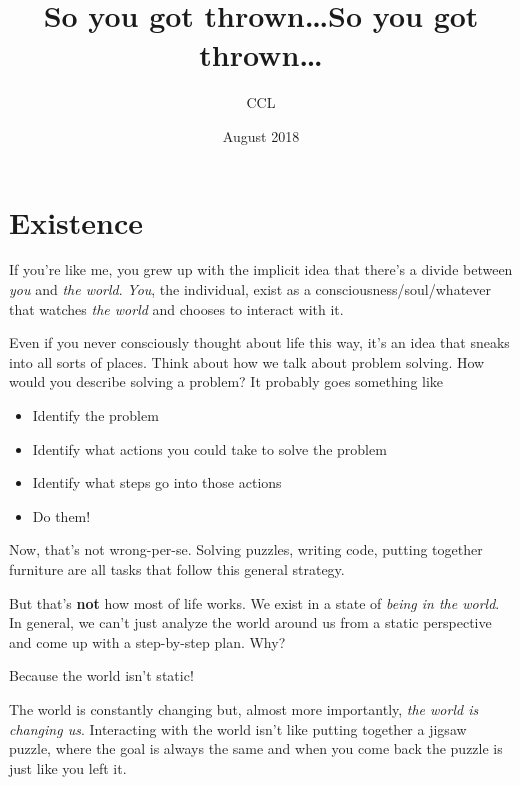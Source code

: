 \documentclass[statementpaper,oneside,article,14pt]{memoir}
\title{So you got thrown\ldots}
\author{CCL}
\date{August 2018}
\newcommand{\BackgroundPic}[1]{%
\put(0,0){%
\parbox[b][\paperheight]{\paperwidth}{%
\vfill
\centering
{\transparent{0.4} \texttt{[image: \#1]}}%
\vfill
}}}
\begin{document}
\title{So you got thrown\ldots}
\author{}
\date{}

\begingroup
\let\cleardoublepage\clearpage

\AddToShipoutPicture*{\BackgroundPic{throwncat}}

\begin{titlingpage}
\maketitle
\end{titlingpage}

\endgroup

\pagestyle{empty}
\section{Existence}
If you're like me, you grew up with the implicit idea that there's a divide between \textit{you} and \textit{the world}. \textit{You}, the individual, exist as a consciousness/soul/whatever that watches \textit{the world} and chooses to interact with it. 

Even if you never consciously thought about life this way, it's an idea that sneaks into all sorts of places. Think about how we talk about problem solving. How would you describe solving a problem? It probably goes something like 

\begin{itemize}
    \item Identify the problem
    \item Identify what actions you could take to solve the problem
    \item Identify what steps go into those actions
    \item Do them!
\end{itemize}

Now, that's not wrong-per-se. Solving puzzles, writing code, putting together furniture are all tasks that follow this general strategy.

But that's \textbf{not} how most of life works. We exist in a state of \textit{being in the world}. In general, we can't just analyze the world around us from a static perspective and come up with a step-by-step plan. Why?

{\Large Because the world isn't static!} 

The world is constantly changing but, almost more importantly, \textit{the world is changing us}. Interacting with the world isn't like putting together a jigsaw puzzle, where the goal is always the same and when you come back the puzzle is just like you left it.
\end{document}
